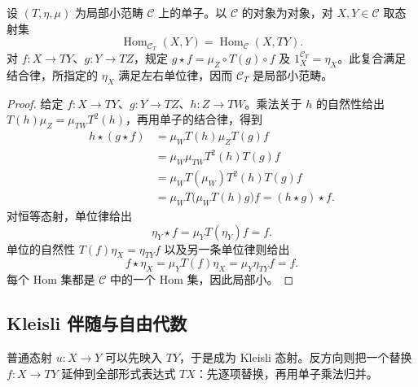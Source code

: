 \begin{proposition}\label{b4:prop:A-kleisli-laws}
	设 \((T,\eta,\mu)\) 为局部小范畴 \(\mathcal C\) 上的单子。以 \(\mathcal C\) 的对象为对象，对 \(X,Y\in\mathcal C\) 取态射集
	\[
		\operatorname{Hom}_{\mathcal C_T}(X,Y)=\operatorname{Hom}_{\mathcal C}(X,TY).
	\]
	对 \(f:X\to TY\)、\(g:Y\to TZ\)，规定 \(g\star f=\mu_Z\circ T(g)\circ f\) 及 \(1_X^{\mathcal C_T}=\eta_X\)。此复合满足结合律，所指定的 \(\eta_X\) 满足左右单位律，因而 \(\mathcal C_T\) 是局部小范畴。
\end{proposition}
\begin{proof}
	给定 \(f:X\to TY\)、\(g:Y\to TZ\)、\(h:Z\to TW\)。乘法关于 \(h\) 的自然性给出 \(T(h)\mu_Z=\mu_{TW}T^2(h)\)，再用单子的结合律，得到
	\[
		\begin{aligned}
			h\star(g\star f) &=\mu_WT(h)\mu_ZT(g)f\\
			&=\mu_W\mu_{TW}T^2(h)T(g)f\\
			&=\mu_WT(\mu_W)T^2(h)T(g)f\\
			&=\mu_WT\bigl(\mu_WT(h)g\bigr)f =(h\star g)\star f.
		\end{aligned}
	\]
	对恒等态射，单位律给出
	\[
		\eta_Y\star f=\mu_YT(\eta_Y)f=f.
	\]
	单位的自然性 \(T(f)\eta_X=\eta_{TY}f\) 以及另一条单位律则给出
	\[
		f\star\eta_X=\mu_YT(f)\eta_X =\mu_Y\eta_{TY}f=f.
	\]
	每个 Hom 集都是 \(\mathcal C\) 中的一个 Hom 集，因此局部小。
\end{proof}

\subsection{Kleisli 伴随与自由代数}
\label{b4:subsec:A05:02}

普通态射 \(u:X\to Y\) 可以先映入 \(TY\)，于是成为 Kleisli 态射。反方向则把一个替换 \(f:X\to TY\) 延伸到全部形式表达式 \(TX\)：先逐项替换，再用单子乘法归并。

